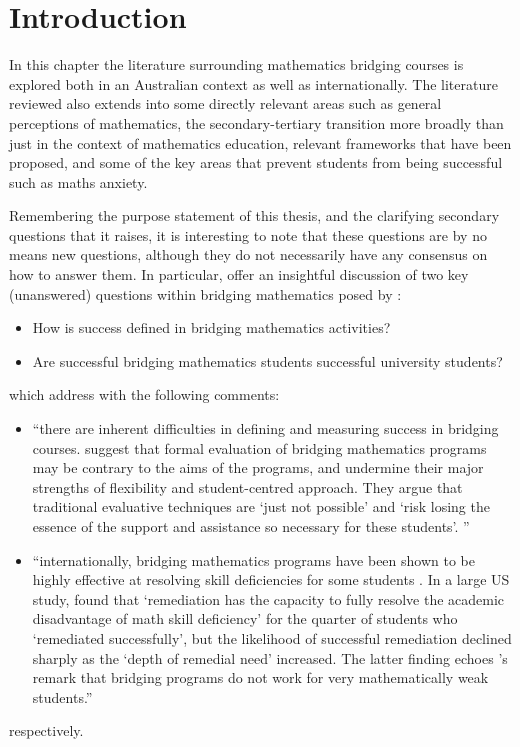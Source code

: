 \documentclass[twoside,12pt,a4paper]{report}
\begin{document}
\section{Introduction}

In this chapter the literature surrounding mathematics bridging courses is explored both in an Australian context as well as internationally. The literature reviewed also extends into some directly relevant areas such as general perceptions of mathematics, the secondary-tertiary transition more broadly than just in the context of mathematics education, relevant frameworks that have been proposed, and some of the key areas that prevent students from being successful such as maths anxiety. 

Remembering the purpose statement of this thesis, and the clarifying secondary questions that it raises, it is interesting to note that these questions are by no means new questions, although they do not necessarily have any consensus on how to answer them. In particular,  offer an insightful discussion of two key (unanswered) questions within bridging mathematics posed by :
\begin{itemize}
	\item How is success defined in bridging mathematics activities?
	\item Are successful bridging mathematics students successful university students?
\end{itemize}
which  address with the following comments:
\begin{itemize}
	\item ``there are inherent difficulties in defining and measuring success
in bridging courses.  suggest that formal evaluation of bridging
mathematics programs may be contrary to the aims of the programs, and undermine their
major strengths of flexibility and student-centred approach. They argue that traditional
evaluative techniques are ‘just not possible’ and ‘risk losing the essence of the support and
assistance so necessary for these students’. ''
	\item ``internationally, bridging mathematics programs have been
shown to be highly effective at resolving skill deficiencies for some students \cite{Kajander2005, Bahr2008}. In a large US study, \cite[p.442]{Bahr2008} found that ‘remediation has the capacity to fully resolve the
academic disadvantage of math skill deficiency’ for the quarter of students who ‘remediated
successfully’, but the likelihood of successful remediation declined sharply as the ‘depth of
remedial need’ increased. The latter finding echoes \cite{Wood2001}'s remark that bridging
programs do not work for very mathematically weak students.''
\end{itemize}
respectively.
\end{document}
